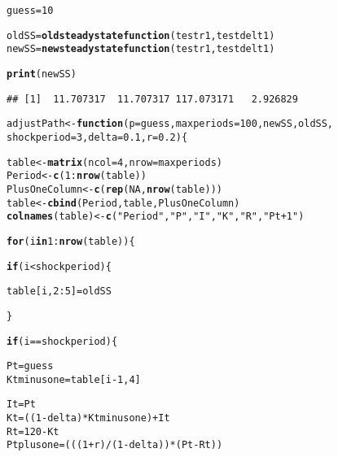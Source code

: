 \documentclass{article}\usepackage[]{graphicx}\usepackage[]{color}
\makeatletter
\newcommand{\hlnum}[1]{\textcolor[rgb]{0.686,0.059,0.569}{#1}}%
\newcommand{\hlstr}[1]{\textcolor[rgb]{0.192,0.494,0.8}{#1}}%
\newcommand{\hlopt}[1]{\textcolor[rgb]{0,0,0}{#1}}%
\newcommand{\hlstd}[1]{\textcolor[rgb]{0.345,0.345,0.345}{#1}}%
\newcommand{\hlkwa}[1]{\textcolor[rgb]{0.161,0.373,0.58}{\textbf{#1}}}%
\newcommand{\hlkwb}[1]{\textcolor[rgb]{0.69,0.353,0.396}{#1}}%
\newcommand{\hlkwc}[1]{\textcolor[rgb]{0.333,0.667,0.333}{#1}}%
\newcommand{\hlkwd}[1]{\textcolor[rgb]{0.737,0.353,0.396}{\textbf{#1}}}%
\newenvironment{kframe}{%
 \def\at@end@of@kframe{}%
 \ifinner\ifhmode%
  \def\at@end@of@kframe{\end{minipage}}%
  \begin{minipage}{\columnwidth}%
 \fi\fi%
 \def\FrameCommand##1{\hskip\@totalleftmargin \hskip-\fboxsep
 \colorbox{shadecolor}{##1}\hskip-\fboxsep
     \hskip-\linewidth \hskip-\@totalleftmargin \hskip\columnwidth}%
 \MakeFramed {\advance\hsize-\width
   \@totalleftmargin\z@ \linewidth\hsize
   \@setminipage}}%
 {\par\unskip\endMakeFramed%
 \at@end@of@kframe}
\newenvironment{knitrout}{}{} %
\makeatother
\begin{document}
\begin{knitrout}
\color{fgcolor}\begin{kframe}
\begin{alltt}
\hlstd{guess} \hlkwb{=} \hlnum{10}

\hlstd{oldSS} \hlkwb{=} \hlkwd{oldsteadystatefunction}\hlstd{(testr1, testdelt1)}
\hlstd{newSS} \hlkwb{=} \hlkwd{newsteadystatefunction}\hlstd{(testr1, testdelt1)}

\hlkwd{print}\hlstd{(newSS)}
\end{alltt}
\begin{verbatim}
## [1]  11.707317  11.707317 117.073171   2.926829
\end{verbatim}
\begin{alltt}
\hlstd{adjustPath} \hlkwb{<-} \hlkwa{function}\hlstd{(}\hlkwc{p} \hlstd{= guess,} \hlkwc{maxperiods} \hlstd{=} \hlnum{100}\hlstd{,} \hlkwc{newSS}\hlstd{,} \hlkwc{oldSS}\hlstd{,}
\hlkwc{shockperiod} \hlstd{=} \hlnum{3}\hlstd{,} \hlkwc{delta} \hlstd{=} \hlnum{0.1}\hlstd{,} \hlkwc{r} \hlstd{=} \hlnum{0.2}\hlstd{) \{}

  \hlstd{table} \hlkwb{<-} \hlkwd{matrix}\hlstd{(}\hlkwc{ncol} \hlstd{=} \hlnum{4}\hlstd{,} \hlkwc{nrow} \hlstd{= maxperiods)}
  \hlstd{Period} \hlkwb{<-} \hlkwd{c}\hlstd{(}\hlnum{1}\hlopt{:}\hlkwd{nrow}\hlstd{(table))}
  \hlstd{PlusOneColumn} \hlkwb{<-} \hlkwd{c}\hlstd{(}\hlkwd{rep}\hlstd{(}\hlnum{NA}\hlstd{,} \hlkwd{nrow}\hlstd{(table)))}
  \hlstd{table} \hlkwb{<-} \hlkwd{cbind}\hlstd{(Period,table,PlusOneColumn)}
  \hlkwd{colnames}\hlstd{(table)} \hlkwb{<-} \hlkwd{c}\hlstd{(}\hlstr{"Period"}\hlstd{,}\hlstr{"P"}\hlstd{,} \hlstr{"I"}\hlstd{,} \hlstr{"K"}\hlstd{,} \hlstr{"R"}\hlstd{,} \hlstr{"Pt + 1"}\hlstd{)}

  \hlkwa{for} \hlstd{(i} \hlkwa{in} \hlnum{1}\hlopt{:}\hlkwd{nrow}\hlstd{(table))\{}

    \hlkwa{if} \hlstd{(i} \hlopt{<} \hlstd{shockperiod)\{}

      \hlstd{table[i,}\hlnum{2}\hlopt{:}\hlnum{5}\hlstd{]} \hlkwb{=} \hlstd{oldSS}

    \hlstd{\}}

    \hlkwa{if} \hlstd{(i} \hlopt{==} \hlstd{shockperiod)\{}

      \hlstd{Pt} \hlkwb{=} \hlstd{guess}
      \hlstd{Ktminusone} \hlkwb{=} \hlstd{table[i}\hlopt{-}\hlnum{1}\hlstd{,}\hlnum{4}\hlstd{]}

      \hlstd{It} \hlkwb{=} \hlstd{Pt}
      \hlstd{Kt} \hlkwb{=} \hlstd{((}\hlnum{1} \hlopt{-} \hlstd{delta)} \hlopt{*} \hlstd{Ktminusone)} \hlopt{+} \hlstd{It}
      \hlstd{Rt} \hlkwb{=} \hlnum{120} \hlopt{-} \hlstd{Kt}
      \hlstd{Ptplusone} \hlkwb{=} \hlstd{(((}\hlnum{1} \hlopt{+} \hlstd{r)} \hlopt{/} \hlstd{(}\hlnum{1} \hlopt{-} \hlstd{delta))} \hlopt{*} \hlstd{(Pt} \hlopt{-} \hlstd{Rt))}


\end{alltt}
\end{kframe}
\end{knitrout}
\end{document}
